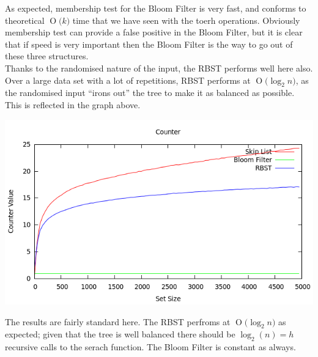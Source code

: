 \documentclass[11pt, notitlepage]{report}
\newcommand{\BigO}[1]{\ensuremath{\operatorname{O}\bigl(#1\bigr)}}
\begin{document}
As expected, membership test for the Bloom Filter is very fast, and conforms to theoretical \BigO{k} time that we have seen with the toerh operations. Obviously membership test can provide a false positive in the Bloom Filter, but it is clear that if speed is very important then the Bloom Filter is the way to go out of these three structures.\\

Thanks to the randomised nature of the input, the RBST performs well here also. Over a large data set with a lot of repetitions, RBST performs at \BigO{\log_2 n}, as the randomised input ``irons out'' the tree to make it as balanced as possible. This is reflected in the graph above.

\includegraphics[width=\linewidth]{img/Counter-Find}

The results are fairly standard here. The RBST perfroms at \BigO{\log_2 n} as expected; given that the tree is well balanced there should be $\log_2(n) = h$ recursive calls to the serach function. The Bloom Filter is constant as always.
\end{document}
